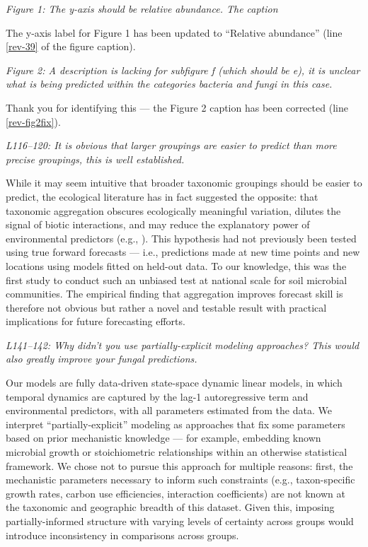 \documentclass[11pt]{article}
\begin{document}
\textit{Figure 1: The y-axis should be relative abundance. The caption}

The y-axis label for Figure 1 has been updated to ``Relative abundance'' (line \ref{rev-39} of the figure caption).

\bigskip

\textit{Figure 2: A description is lacking for subfigure f (which should be e), it is unclear what is being predicted within the categories bacteria and fungi in this case.}

Thank you for identifying this --- the Figure 2 caption has been corrected (line \ref{rev-fig2fix}).

\bigskip

\textit{L116--120: It is obvious that larger groupings are easier to predict than more precise groupings, this is well established.}

While it may seem intuitive that broader taxonomic groupings should be easier to predict, the ecological literature has in fact suggested the opposite: that taxonomic aggregation obscures ecologically meaningful variation, dilutes the signal of biotic interactions, and may reduce the explanatory power of environmental predictors (e.g., %
). This hypothesis had not previously been tested using true forward forecasts --- i.e., predictions made at new time points and new locations using models fitted on held-out data. To our knowledge, this was the first study to conduct such an unbiased test at national scale for soil microbial communities. The empirical finding that aggregation improves forecast skill is therefore not obvious but rather a novel and testable result with practical implications for future forecasting efforts.

\bigskip

\textit{L141--142: Why didn't you use partially-explicit modeling approaches? This would also greatly improve your fungal predictions.}

Our models are fully data-driven state-space dynamic linear models, in which temporal dynamics are captured by the lag-1 autoregressive term and environmental predictors, with all parameters estimated from the data. We interpret ``partially-explicit'' modeling as approaches that fix some parameters based on prior mechanistic knowledge --- for example, embedding known microbial growth or stoichiometric relationships within an otherwise statistical framework. We chose not to pursue this approach for multiple reasons: first, the mechanistic parameters necessary to inform such constraints (e.g., taxon-specific growth rates, carbon use efficiencies, interaction coefficients) are not known at the taxonomic and geographic breadth of this dataset. Given this, imposing partially-informed structure with varying levels of certainty across groups would introduce inconsistency in comparisons across groups.
\end{document}
